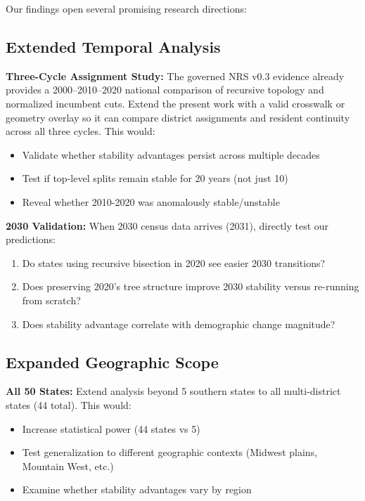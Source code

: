 Our findings open several promising research directions:

\subsection{Extended Temporal Analysis}

\textbf{Three-Cycle Assignment Study:} The governed NRS v0.3 evidence already
provides a 2000--2010--2020 national comparison of recursive topology and
normalized incumbent cuts. Extend the present work with a valid crosswalk or
geometry overlay so it can compare district assignments and resident
continuity across all three cycles. This would:
\begin{itemize}
    \item Validate whether stability advantages persist across multiple decades
    \item Test if top-level splits remain stable for 20 years (not just 10)
    \item Reveal whether 2010-2020 was anomalously stable/unstable
\end{itemize}

\textbf{2030 Validation:} When 2030 census data arrives (2031), directly test our predictions:
\begin{enumerate}
    \item Do states using recursive bisection in 2020 see easier 2030 transitions?
    \item Does preserving 2020's tree structure improve 2030 stability versus re-running from scratch?
    \item Does stability advantage correlate with demographic change magnitude?
\end{enumerate}

\subsection{Expanded Geographic Scope}

\textbf{All 50 States:} Extend analysis beyond 5 southern states to all multi-district states (44 total). This would:
\begin{itemize}
    \item Increase statistical power (44 states vs 5)
    \item Test generalization to different geographic contexts (Midwest plains, Mountain West, etc.)
    \item Examine whether stability advantages vary by region
\end{itemize}

